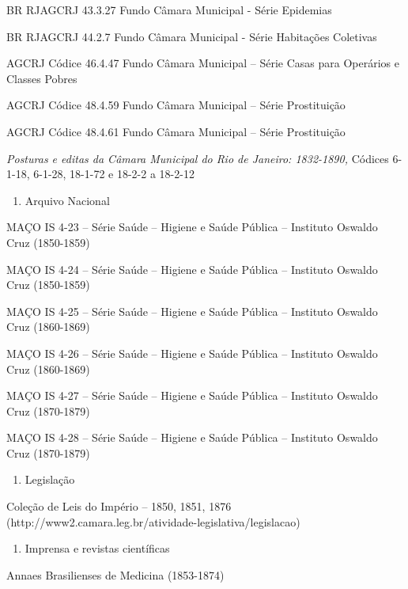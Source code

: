 BR RJAGCRJ 43.3.27 Fundo Câmara Municipal - Série Epidemias

BR RJAGCRJ 44.2.7 Fundo Câmara Municipal - Série Habitações Coletivas

AGCRJ Códice 46.4.47 Fundo Câmara Municipal -- Série Casas para
Operários e Classes Pobres

AGCRJ Códice 48.4.59 Fundo Câmara Municipal -- Série Prostituição

AGCRJ Códice 48.4.61 Fundo Câmara Municipal -- Série Prostituição

\emph{Posturas e editas da Câmara Municipal do Rio de Janeiro:
1832-1890,} Códices 6-1-18, 6-1-28, 18-1-72 e 18-2-2 a 18-2-12

\begin{enumerate}
\def\labelenumi{\arabic{enumi}.}
\setcounter{enumi}{1}
\tightlist
\item
  Arquivo Nacional
\end{enumerate}

MAÇO IS 4-23 -- Série Saúde -- Higiene e Saúde Pública -- Instituto
Oswaldo Cruz (1850-1859)

MAÇO IS 4-24 -- Série Saúde -- Higiene e Saúde Pública -- Instituto
Oswaldo Cruz (1850-1859)

MAÇO IS 4-25 -- Série Saúde -- Higiene e Saúde Pública -- Instituto
Oswaldo Cruz (1860-1869)

MAÇO IS 4-26 -- Série Saúde -- Higiene e Saúde Pública -- Instituto
Oswaldo Cruz (1860-1869)

MAÇO IS 4-27 -- Série Saúde -- Higiene e Saúde Pública -- Instituto
Oswaldo Cruz (1870-1879)

MAÇO IS 4-28 -- Série Saúde -- Higiene e Saúde Pública -- Instituto
Oswaldo Cruz (1870-1879)

\begin{enumerate}
\def\labelenumi{\arabic{enumi}.}
\setcounter{enumi}{2}
\tightlist
\item
  Legislação
\end{enumerate}

Coleção de Leis do Império -- 1850, 1851, 1876
(http://www2.camara.leg.br/atividade-legislativa/legislacao)

\begin{enumerate}
\def\labelenumi{\arabic{enumi}.}
\setcounter{enumi}{3}
\tightlist
\item
  Imprensa e revistas científicas
\end{enumerate}

Annaes Brasilienses de Medicina (1853-1874)

